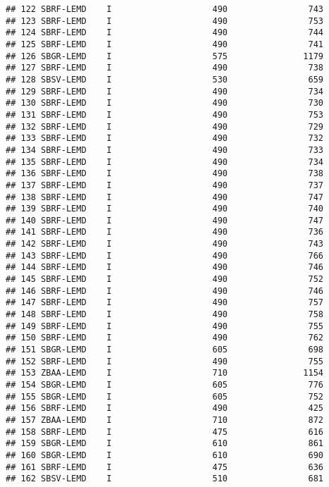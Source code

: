 \documentclass[
]{article}
\begin{document}
\begin{verbatim}
## 122 SBRF-LEMD    I                    490                743
## 123 SBRF-LEMD    I                    490                753
## 124 SBRF-LEMD    I                    490                744
## 125 SBRF-LEMD    I                    490                741
## 126 SBGR-LEMD    I                    575               1179
## 127 SBRF-LEMD    I                    490                738
## 128 SBSV-LEMD    I                    530                659
## 129 SBRF-LEMD    I                    490                734
## 130 SBRF-LEMD    I                    490                730
## 131 SBRF-LEMD    I                    490                753
## 132 SBRF-LEMD    I                    490                729
## 133 SBRF-LEMD    I                    490                732
## 134 SBRF-LEMD    I                    490                733
## 135 SBRF-LEMD    I                    490                734
## 136 SBRF-LEMD    I                    490                738
## 137 SBRF-LEMD    I                    490                737
## 138 SBRF-LEMD    I                    490                747
## 139 SBRF-LEMD    I                    490                740
## 140 SBRF-LEMD    I                    490                747
## 141 SBRF-LEMD    I                    490                736
## 142 SBRF-LEMD    I                    490                743
## 143 SBRF-LEMD    I                    490                766
## 144 SBRF-LEMD    I                    490                746
## 145 SBRF-LEMD    I                    490                752
## 146 SBRF-LEMD    I                    490                746
## 147 SBRF-LEMD    I                    490                757
## 148 SBRF-LEMD    I                    490                758
## 149 SBRF-LEMD    I                    490                755
## 150 SBRF-LEMD    I                    490                762
## 151 SBGR-LEMD    I                    605                698
## 152 SBRF-LEMD    I                    490                755
## 153 ZBAA-LEMD    I                    710               1154
## 154 SBGR-LEMD    I                    605                776
## 155 SBGR-LEMD    I                    605                752
## 156 SBRF-LEMD    I                    490                425
## 157 ZBAA-LEMD    I                    710                872
## 158 SBRF-LEMD    I                    475                616
## 159 SBGR-LEMD    I                    610                861
## 160 SBGR-LEMD    I                    610                690
## 161 SBRF-LEMD    I                    475                636
## 162 SBSV-LEMD    I                    510                681

\end{verbatim}
\end{document}
